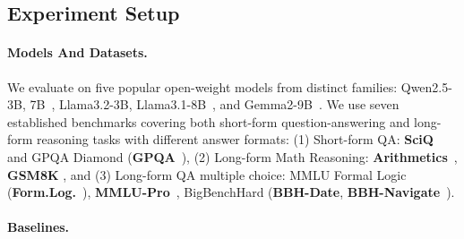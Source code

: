 \subsection{Experiment Setup}\label{sec:experiment-setup}

\paragraph{Models And Datasets.} We evaluate on five popular open-weight models from distinct families: Qwen2.5-3B, 7B~\citep{yang2025qwen25}, Llama3.2-3B, Llama3.1-8B~\citep{grattafiori2024llama}, and Gemma2-9B~\citep{team2024gemma}. We use seven established benchmarks covering both short-form question-answering and long-form reasoning tasks with different answer formats: (1) Short-form QA: \textbf{SciQ}~\citep{welbl2017crowdsourcing} and GPQA Diamond (\textbf{GPQA}~\citep{rein2024gpqa}), (2) Long-form Math Reasoning: \textbf{Arithmetics}~\citep{choi2025debate}, \textbf{GSM8K} \citep{cobbe2021training}, and (3) Long-form QA multiple choice: MMLU Formal Logic (\textbf{Form.Log.}~\citep{hendrycks2020aligning}), \textbf{MMLU-Pro}~\citep{wang2024mmlu}, BigBenchHard (\textbf{BBH-Date}, \textbf{BBH-Navigate}~\citep{suzgun2023challenging}).


\paragraph{Baselines.} 

